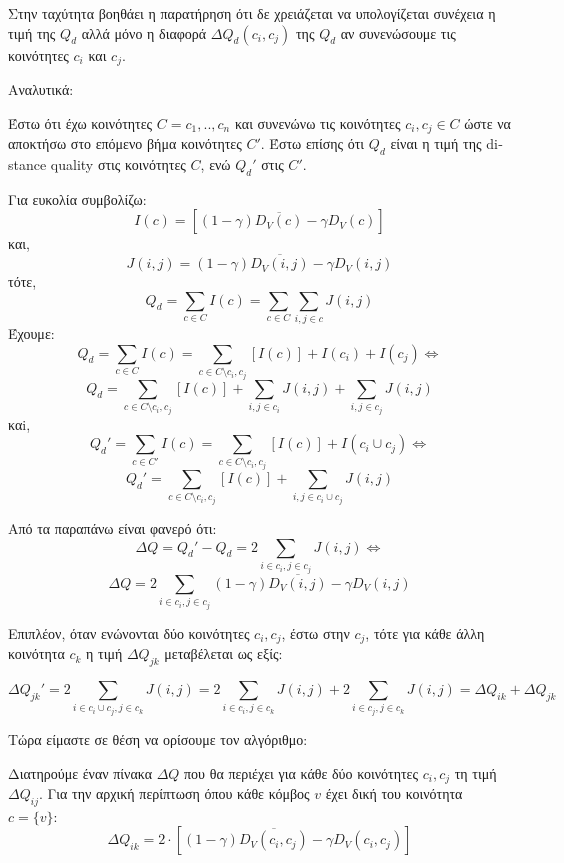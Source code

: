 \documentclass[12pt, letterpaper]{article}
\begin{document}
Στην ταχύτητα βοηθάει η παρατήρηση ότι δε χρειάζεται να υπολογίζεται συνέχεια η τιμή της $Q_d$ αλλά μόνο η διαφορά $\Delta Q_d(c_i,c_j)$ της $Q_d$ αν συνενώσουμε τις 
κοινότητες $c_i$ και $c_j$. 


Αναλυτικά:

Έστω ότι έχω κοινότητες $C = {c_1,..,c_n}$ και συνενώνω τις κοινότητες $c_i,c_j \in C$ ώστε να αποκτήσω
στο επόμενο βήμα κοινότητες $C'$. Έστω επίσης ότι $Q_d$ είναι η τιμή της \textlatin{distance quality}
στις κοινότητες $C$, ενώ $Q_d'$ στις $C'$. 



Για ευκολία συμβολίζω: 
\[ I(c) = [(1 - \gamma)\overline{ D_V(c) } - \gamma D_V(c)] \]
και,
\[ J(i,j) = (1-\gamma) \overline{ D_V(i,j)} - \gamma D_V(i,j) \]
τότε,
\[ Q_d = \sum_{c \in C} I(c) =\sum_{c \in C} \sum_{i,j \in c} J(i,j) \]
Έχουμε:
\[ Q_d  = \sum_{c \in C} I(c) =  \sum_{c \in C \setminus c_i,c_j}[I(c)] + I(c_i) + I(c_j) \Leftrightarrow\]
\[ Q_d = \sum_{c \in C \setminus c_i,c_j}[I(c)] + \sum_{i,j \in c_i}J(i,j) + \sum_{i,j \in c_j}J(i,j)  \]
καi,
\[ Q_d' = \sum_{c \in C'} I(c) =  \sum_{c \in C \setminus c_i,c_j}[I(c)] + I(c_i \cup c_j) \Leftrightarrow \]
\[ Q_d' =  \sum_{c \in C \setminus c_i,c_j}[I(c)] + \sum_{i,j \in c_i \cup c_j} J(i,j) \]



Από τα παραπάνω είναι φανερό ότι:
\[   \Delta Q = Q_d' - Q_d = 2 \sum_{i \in c_i, j \in c_j} J(i,j) \Leftrightarrow \]
\[ \Delta Q = 2 \sum_{i \in c_i, j \in c_j} (1-\gamma) \overline{ D_V(i,j)} - \gamma D_V(i,j) \]

\bigskip

Επιπλέον, όταν ενώνονται δύο κοινότητες $c_i,c_j$, έστω στην $c_j$, τότε για κάθε 
άλλη κοινότητα $c_k$ η τιμή $\Delta Q_{jk}$ μεταβέλεται ως εξίς:

\[ \Delta Q_{jk}' = 2 \sum_{i \in c_i \cup c_j, j \in c_k} J(i,j) = 2 \sum_{i \in c_i, j \in c_k} J(i,j) + 2 \sum_{i \in c_j, j \in c_k} J(i,j) = \Delta Q_{ik} + \Delta Q_{jk}\]


Τώρα είμαστε σε θέση να ορίσουμε τον αλγόριθμο:

Διατηρούμε έναν πίνακα $\Delta Q$ που θα περιέχει για κάθε δύο κοινότητες $c_i,c_j$ 
τη τιμή $\Delta Q_{ij}$. Για την αρχική περίπτωση όπου κάθε κόμβος $v$ έχει δική του 
κοινότητα $c=\{v\}$: 
\begin{equation}   \label{init_dq}
  \Delta Q_{ik} = 2 \cdot [(1-\gamma)\overline{ D_V(c_i,c_j)} - \gamma  D_V(c_i,c_j)   ]
\end{equation}
\end{document}

